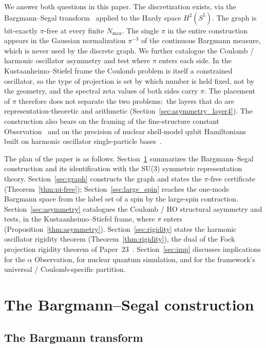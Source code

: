 \documentclass[twocolumn,pra,amsmath,amssymb,superscriptaddress]{revtex4-2}
\begin{document}
We answer both questions in this paper.  The discretization exists,
via the Bargmann--Segal transform~\cite{bargmann1961, hall1994}
applied to the Hardy space $H^2(S^5)$.  The graph is bit-exactly
$\pi$-free at every finite $N_{\max}$.  The single $\pi$ in the
entire construction appears in the Gaussian normalization $\pi^{-3}$
of the continuous Bargmann measure, which is never used by the
discrete graph.  We further catalogue the Coulomb / harmonic
oscillator asymmetry and test where $\pi$ enters each side.  In the
Kustaanheimo--Stiefel frame the Coulomb problem is itself a
constrained oscillator, so the type of projection is set by which
number is held fixed, not by the geometry, and the spectral zeta
values of both sides carry $\pi$.  The placement of $\pi$ therefore
does not separate the two problems;\ the layers that do are
representation-theoretic and arithmetic
(Section~\ref{sec:asymmetry_layer4}).  The construction also bears on
the framing of the fine-structure constant
Observation~\cite{paper2_alpha} and on the precision of nuclear
shell-model qubit Hamiltonians built on harmonic oscillator
single-particle bases~\cite{paper23}.

The plan of the paper is as follows.  Section~\ref{sec:bs}
summarizes the Bargmann--Segal construction and its identification
with the SU(3) symmetric representation theory.
Section~\ref{sec:graph} constructs the graph and states the
$\pi$-free certificate (Theorem~\ref{thm:pi-free});
Section~\ref{sec:large_spin} reaches the one-mode Bargmann space from
the label set of a spin by the large-spin contraction.
Section~\ref{sec:asymmetry} catalogues the Coulomb / HO structural
asymmetry and tests, in the Kustaanheimo--Stiefel frame, where $\pi$
enters (Proposition~\ref{thm:asymmetry}).
Section~\ref{sec:rigidity} states the harmonic oscillator rigidity
theorem (Theorem~\ref{thm:rigidity}), the dual of the Fock projection
rigidity theorem of Paper~23~\cite{paper23}.  Section~\ref{sec:imp}
discusses implications for the $\alpha$ Observation, for nuclear
quantum simulation, and for the framework's universal /
Coulomb-specific partition.

\section{The Bargmann--Segal construction}
\label{sec:bs}

\subsection{The Bargmann transform}
\end{document}
